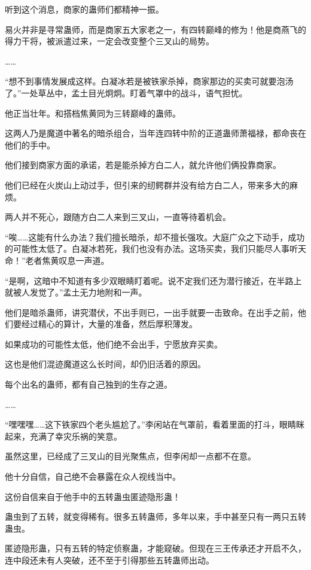 \begin{this_body}
听到这个消息，商家的蛊师们都精神一振。

易火并非是寻常蛊师，而是商家五大家老之一，有四转巅峰的修为！他是商燕飞的得力干将，被派遣过来，一定会改变整个三叉山的局势。

……

“想不到事情发展成这样。白凝冰若是被铁家杀掉，商家那边的买卖可就要泡汤了。”一处草丛中，孟土目光炯炯。盯着气罩中的战斗，语气担忧。

他正当壮年。和搭档焦黄同为三转巅峰的蛊师。

这两人乃是魔道中著名的暗杀组合，当年连四转中阶的正道蛊师萧福禄，都命丧在他们的手中。

他们接到商家方面的承诺，若是能杀掉方白二人，就允许他们俩投靠商家。

他们已经在火炭山上动过手，但引来的纫鳄群并没有给方白二人，带来多大的麻烦。

两人并不死心，跟随方白二人来到三叉山，一直等待着机会。

“唉……这能有什么办法？我们擅长暗杀，却不擅长强攻。大庭广众之下动手，成功的可能性太低了。白凝冰若死，我们也没有办法。这场买卖，我们只能尽人事听天命！”老者焦黄叹息一声道。

“是啊，这暗中不知道有多少双眼睛盯着呢。说不定我们还为潜行接近，在半路上就被人发觉了。”孟土无力地附和一声。

他们是暗杀蛊师，讲究潜伏，不出手则已，一出手就要一击致命。在出手之前，他们要经过精心的算计，大量的准备，然后厚积薄发。

如果成功的可能性太低，他们绝不会出手，宁愿放弃买卖。

这也是他们混迹魔道这么长时间，却仍旧活着的原因。

每个出名的蛊师，都有自己独到的生存之道。

……

“嘿嘿嘿……这下铁家四个老头尴尬了。”李闲站在气罩前，看着里面的打斗，眼睛眯起来，充满了幸灾乐祸的笑意。

虽然这里，已经成了三叉山的目光聚焦点，但李闲却一点都不在意。

他十分自信，自己绝不会暴露在众人视线当中。

这份自信来自于他手中的五转蛊虫匿迹隐形蛊！

蛊虫到了五转，就变得稀有。很多五转蛊师，多年以来，手中甚至只有一两只五转蛊虫。

匿迹隐形蛊，只有五转的特定侦察蛊，才能窥破。但现在三王传承还才开启不久，连中段还未有人突破，还不至于引得那些五转蛊师出动。


\end{this_body}
